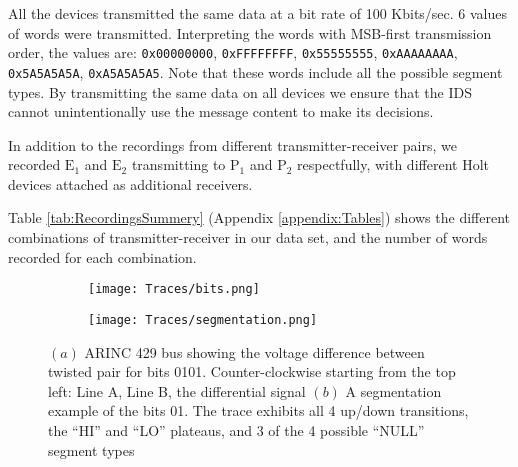 \documentclass[english]{llncs}
\begin{document}
  
  All the devices transmitted the same data at a bit rate of 100 Kbits/sec. 6 values of words were transmitted. Interpreting the words with MSB-first transmission order, the values are: \texttt{0x00000000}, \texttt{0xFFFFFFFF}, \texttt{0x55555555}, \texttt{0xAAAAAAAA}, \texttt{0x5A5A5A5A}, \texttt{0xA5A5A5A5}. Note that these words include all the possible segment types. By transmitting the same data on all devices we ensure that
  the IDS cannot unintentionally use the message content to make its decisions.
  
  In addition to the recordings from different transmitter-receiver pairs, we recorded \(\text{E}_1\) and \(\text{E}_2\) transmitting to \(\text{P}_1\) and \(\text{P}_2\) respectfully, with different Holt devices attached as additional receivers.
  
  Table \ref{tab:RecordingsSummery} (Appendix \ref{appendix:Tables}) shows the different combinations of transmitter-receiver in our data set, and the number of words recorded for each combination.

  \begin{figure}[t]
    \centering
    \begin{subfigure}{0.5\textwidth}
      \centering
      \texttt{[image: Traces/bits.png]}
      \caption{}
      \label{fig:word_example}
    \end{subfigure}%
    \begin{subfigure}{0.5\textwidth}
      \centering
      \texttt{[image: Traces/segmentation.png]}
      \caption{}
      \label{fig:SegmentationTrace}
    \end{subfigure}
    \caption{\((a)\) ARINC 429 bus showing the voltage difference between twisted pair for bits 0101. Counter-clockwise starting from the top left: Line A, Line B, the differential signal \((b)\) A segmentation example of the bits 01. The trace exhibits all 4 up/down transitions, the ``HI'' and ``LO'' plateaus, and 3 of the 4 possible ``NULL'' segment types}
  \end{figure}
\end{document}

